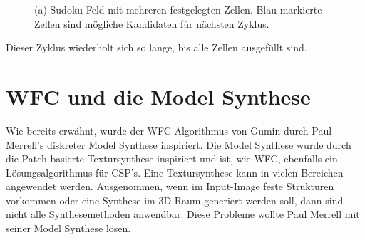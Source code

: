\documentclass[12pt, a4paper,twoside,openright]{report} %
\begin{document}
\begin{figure}[H]
    \centering
    \caption{(a) Sudoku Feld mit mehreren festgelegten Zellen. Blau markierte Zellen sind mögliche Kandidaten für nächsten Zyklus.}%
\end{figure}

Dieser Zyklus wiederholt sich so lange, bis alle Zellen ausgefüllt sind.

\section{WFC und die Model Synthese}

Wie bereits erwähnt, wurde der WFC Algorithmus von Gumin durch Paul Merrell's diskreter Model Synthese inspiriert.
Die Model Synthese wurde durch die Patch basierte Textursynthese inspiriert und ist, wie WFC, ebenfalls ein Lösungsalgorithmus für CSP's.
\newline
Eine Textursynthese kann in vielen Bereichen angewendet werden.
Ausgenommen, wenn im Input-Image feste Strukturen vorkommen oder eine Synthese im 3D-Raum generiert werden soll,
dann sind nicht alle Synthesemethoden anwendbar.
Diese Probleme wollte Paul Merrell mit seiner Model Synthese lösen. \cite{merrell2009model}
\end{document}
